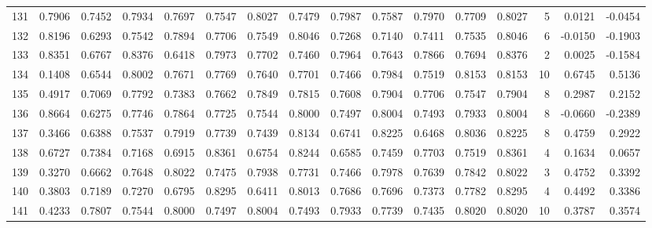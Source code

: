 \begin{tabular}{lrrrrrrrrrrrrrrr}
131 &      0.7906 &  0.7452 &  0.7934 &  0.7697 &  0.7547 &  0.8027 &  0.7479 &  0.7987 &  0.7587 &  0.7970 &   0.7709 &     0.8027 &      5 &                    0.0121 &                    -0.0454 \\
132 &      0.8196 &  0.6293 &  0.7542 &  0.7894 &  0.7706 &  0.7549 &  0.8046 &  0.7268 &  0.7140 &  0.7411 &   0.7535 &     0.8046 &      6 &                   -0.0150 &                    -0.1903 \\
133 &      0.8351 &  0.6767 &  0.8376 &  0.6418 &  0.7973 &  0.7702 &  0.7460 &  0.7964 &  0.7643 &  0.7866 &   0.7694 &     0.8376 &      2 &                    0.0025 &                    -0.1584 \\
134 &      0.1408 &  0.6544 &  0.8002 &  0.7671 &  0.7769 &  0.7640 &  0.7701 &  0.7466 &  0.7984 &  0.7519 &   0.8153 &     0.8153 &     10 &                    0.6745 &                     0.5136 \\
135 &      0.4917 &  0.7069 &  0.7792 &  0.7383 &  0.7662 &  0.7849 &  0.7815 &  0.7608 &  0.7904 &  0.7706 &   0.7547 &     0.7904 &      8 &                    0.2987 &                     0.2152 \\
136 &      0.8664 &  0.6275 &  0.7746 &  0.7864 &  0.7725 &  0.7544 &  0.8000 &  0.7497 &  0.8004 &  0.7493 &   0.7933 &     0.8004 &      8 &                   -0.0660 &                    -0.2389 \\
137 &      0.3466 &  0.6388 &  0.7537 &  0.7919 &  0.7739 &  0.7439 &  0.8134 &  0.6741 &  0.8225 &  0.6468 &   0.8036 &     0.8225 &      8 &                    0.4759 &                     0.2922 \\
138 &      0.6727 &  0.7384 &  0.7168 &  0.6915 &  0.8361 &  0.6754 &  0.8244 &  0.6585 &  0.7459 &  0.7703 &   0.7519 &     0.8361 &      4 &                    0.1634 &                     0.0657 \\
139 &      0.3270 &  0.6662 &  0.7648 &  0.8022 &  0.7475 &  0.7938 &  0.7731 &  0.7466 &  0.7978 &  0.7639 &   0.7842 &     0.8022 &      3 &                    0.4752 &                     0.3392 \\
140 &      0.3803 &  0.7189 &  0.7270 &  0.6795 &  0.8295 &  0.6411 &  0.8013 &  0.7686 &  0.7696 &  0.7373 &   0.7782 &     0.8295 &      4 &                    0.4492 &                     0.3386 \\
141 &      0.4233 &  0.7807 &  0.7544 &  0.8000 &  0.7497 &  0.8004 &  0.7493 &  0.7933 &  0.7739 &  0.7435 &   0.8020 &     0.8020 &     10 &                    0.3787 &                     0.3574 \\

\end{tabular}
